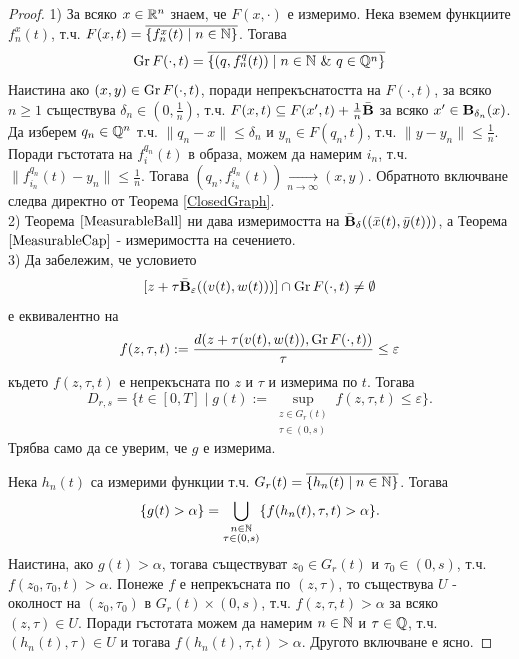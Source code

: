 \begin{proof}
    1) За всяко $x\in\mathbb{R}^n$ знаем, че $F(x,\cdot)$ е измеримо. Нека вземем функциите $f_n^x(t)$, т.ч. $F(x,t) = \overline{\{f^x_n(t) \mid n\in\mathbb{N}\}}$. Тогава
    \[
        \operatorname{Gr} F(\cdot, t) = \overline{\{(q,f_n^q(t)) \mid n\in\mathbb{N}\ \&\ q\in\mathbb{Q}^n\}}
    \]
    Наистина ако $(x,y)\in\operatorname{Gr} F(\cdot, t)$, поради непрекъснатостта на $F(\cdot, t)$, за всяко $n\geq 1$ съществува $\delta_n \in (0, \frac{1}{n})$, т.ч. $F(x,t) \subseteq F(x', t) + \frac{1}{n}\bar{\textbf{B}}$ за всяко $x'\in \textbf{B}_{\delta_n}(x)$.
    Да изберем $q_n\in\mathbb{Q}^n$ т.ч. $\lVert q_n - x\rVert \leq \delta_n$ и $y_n\in F(q_n, t)$, т.ч. $\lVert y - y_n\rVert \leq \frac{1}{n}$.
    Поради гъстотата на $f_i^{q_n}(t)$ в образа, можем да намерим $i_n$, т.ч. $\lVert f_{i_n}^{q_n}(t) - y_n \rVert \leq \frac{1}{n}$.
    Тогава $(q_n, f_{i_n}^{q_n}(t)) \xrightarrow[n\to\infty]{} (x,y)$.
    Обратното включване следва директно от Теорема \ref{ClosedGraph}.\\
    2) Теорема $\ref{MeasurableBall}$ ни дава измеримостта на $\bar{\textbf{B}}_{\delta}((\bar{x}(t),\bar{y}(t)))$, а Теорема $\ref{MeasurableCap}$ - измеримостта на сечението.\\
    3) Да забележим, че условието
    \[
        [z + \tau \bar{\textbf{B}}_{\varepsilon}((v(t),w(t)))]\cap\operatorname{Gr} F(\cdot, t)\neq\emptyset
    \]
    е еквивалентно на
    \[
        f(z, \tau, t) := \frac{d(z+\tau(v(t),w(t)), \operatorname{Gr} F(\cdot, t))}{\tau} \leq \varepsilon
    \]
    където $f(z,\tau,t)$ е непрекъсната по $z$ и $\tau$ и измерима по $t$.
    Тогава
    \[
        D_{r,s} = \{t\in [0,T] \mid g(t) := \sup_{\substack{z\in G_r(t)\\\tau\in(0,s)}} f(z,\tau,t)\leq\varepsilon\}.
    \]
    Трябва само да се уверим, че $g$ е измерима.

    Нека $h_n(t)$ са измерими функции т.ч. $G_r(t) = \overline{\{h_n(t) \mid n\in\mathbb{N}\}}$. Тогава
    \[
        \{ g(t) > \alpha \} = \bigcup_{\substack{n\in\mathbb{N}\\\tau\in(0,s)}} \{ f(h_n(t),\tau,t) > \alpha \}.
    \]
    Наистина, ако $g(t) > \alpha$, тогава съществуват $z_0\in G_r(t)$ и $\tau_0\in (0,s)$, т.ч. $f(z_0, \tau_0, t) > \alpha$.
    Понеже $f$ е непрекъсната по $(z,\tau)$, то съществува $U$ - околност на $(z_0, \tau_0)$ в $G_r(t)\times (0,s)$, т.ч. $f(z,\tau,t) > \alpha$ за всяко $(z,\tau)\in U$.
    Поради гъстотата можем да намерим $n\in\mathbb{N}$ и $\tau\in\mathbb{Q}$, т.ч. $(h_n(t), \tau)\in U$ и тогава $f(h_n(t), \tau, t) > \alpha$.
    Другото включване е ясно.
\end{proof}

